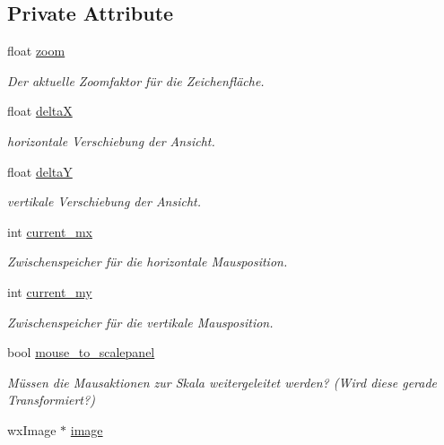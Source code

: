 \subsection*{Private Attribute}
\begin{DoxyCompactItemize}
\item 
float \hyperlink{classGUIRenderCutCanvas_ac680bbbc673a6b336dcfc812c70a0779}{zoom}
\begin{DoxyCompactList}\small\item\em Der aktuelle Zoomfaktor für die Zeichenfläche. \end{DoxyCompactList}\item 
float \hyperlink{classGUIRenderCutCanvas_a28357900ca23a3d3519af015ed6333ba}{delta\-X}
\begin{DoxyCompactList}\small\item\em horizontale Verschiebung der Ansicht. \end{DoxyCompactList}\item 
float \hyperlink{classGUIRenderCutCanvas_a17b630c38009368a99e37b9f0eab3deb}{delta\-Y}
\begin{DoxyCompactList}\small\item\em vertikale Verschiebung der Ansicht. \end{DoxyCompactList}\item 
int \hyperlink{classGUIRenderCutCanvas_af6d75eea1254d03ed36a07a865bf48c1}{current\-\_\-mx}
\begin{DoxyCompactList}\small\item\em Zwischenspeicher für die horizontale Mausposition. \end{DoxyCompactList}\item 
int \hyperlink{classGUIRenderCutCanvas_a349deb05f26285eaf8207cbe45bf6603}{current\-\_\-my}
\begin{DoxyCompactList}\small\item\em Zwischenspeicher für die vertikale Mausposition. \end{DoxyCompactList}\item 
bool \hyperlink{classGUIRenderCutCanvas_a67247191a5442c586d32c9ef6cb1df2e}{mouse\-\_\-to\-\_\-scalepanel}
\begin{DoxyCompactList}\small\item\em Müssen die Mausaktionen zur Skala weitergeleitet werden? (Wird diese gerade Transformiert?) \end{DoxyCompactList}\item 
wx\-Image $\ast$ \hyperlink{classGUIRenderCutCanvas_a11ac45e65920dedf0cfbba21865dc2f9}{image}

\end{DoxyCompactItemize}
